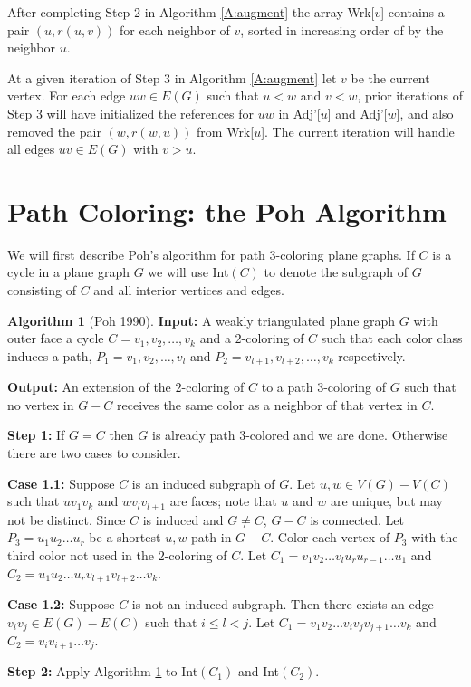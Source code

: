 \documentclass[12pt,letterpaper]{article}
\theoremstyle{plain}
\theoremstyle{definition}
\theoremstyle{break}
\newtheorem{algorithm}[lemma]{Algorithm}     %
\begin{document}
After completing Step 2 in Algorithm \ref{A:augment} the array Wrk[$v$] contains
a pair $(u,r(u,v))$ for each neighbor of $v$, sorted in increasing order of by
the neighbor $u$.

At a given iteration of Step 3 in Algorithm \ref{A:augment} let $v$ be the
current vertex. For each edge $uw\in E(G)$ such that
$u<w$ and $v<w$, prior iterations of Step 3 will have initialized the
references for $uw$ in Adj'[$u$] and Adj'[$w$], and also removed the pair
$(w,r(w,u))$ from Wrk[$u$]. The current iteration will handle all edges
$uv\in E(G)$ with $v>u$.

\section{Path Coloring: the Poh Algorithm}

We will first describe Poh's algorithm for path $3$-coloring plane graphs.
If $C$ is a cycle in a plane graph $G$ we will use Int$(C)$ to denote
the subgraph of $G$ consisting of $C$ and all interior vertices and edges.

\begin{algorithm}[Poh 1990] \label{A:planar3}
\textbf{Input:} A weakly triangulated plane graph $G$ with outer face a
cycle $C=v_1,v_2,\ldots, v_k$ and a $2$-coloring of $C$ such
that each color class induces a path, $P_1=v_1,v_2,\ldots, v_l$ and
$P_2=v_{l+1},v_{l+2},\ldots, v_k$ respectively.

\noindent\textbf{Output:} An extension of the $2$-coloring of $C$ to a path
$3$-coloring of $G$ such that no vertex in $G-C$ receives the same color as a
neighbor of that vertex in $C$.

\noindent\textbf{Step 1:} If $G=C$ then $G$ is already path $3$-colored and we
are done. Otherwise there are two cases to consider.

\noindent\textbf{Case 1.1:} Suppose $C$ is an induced subgraph of $G$. Let
$u,w\in V(G)-V(C)$ such that $uv_1v_k$ and $wv_lv_{l+1}$ are faces; note that
$u$ and $w$ are unique, but may not be distinct. Since $C$ is induced and
$G\ne C$, $G-C$ is connected.
Let $P_3=u_1u_2\ldots u_r$ be a shortest $u,w$-path in $G-C$.
Color each vertex of $P_3$ with the third color not used in the $2$-coloring of
$C$. Let $C_1=v_1v_2\ldots v_lu_ru_{r-1}\ldots u_1$ and
$C_2=u_1u_2\ldots u_rv_{l+1}v_{l+2}\ldots v_k$.

\noindent\textbf{Case 1.2:} Suppose $C$ is not an induced subgraph. Then there
exists an edge $v_iv_j\in E(G)-E(C)$ such that $i\le l < j$. Let
$C_1=v_1v_2\ldots v_iv_jv_{j+1}\ldots v_k$
and $C_2=v_iv_{i+1}\ldots v_j$.

\noindent\textbf{Step 2:} Apply Algorithm \ref{A:planar3} to
Int$(C_1)$ and Int$(C_2)$.
\end{algorithm}
\end{document}
